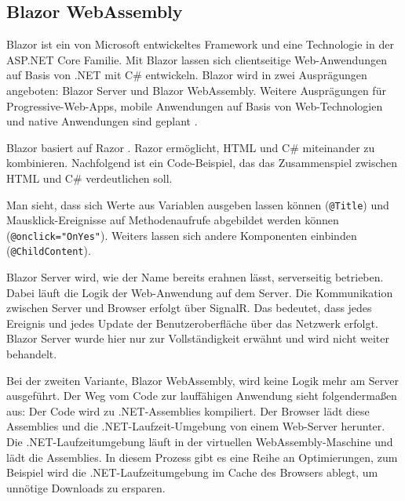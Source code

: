 

\subsection{Blazor WebAssembly}
Blazor \cite{Blazor} ist ein von Microsoft entwickeltes Framework und eine Technologie in der ASP.NET Core Familie. Mit Blazor lassen sich clientseitige Web-Anwendungen auf Basis von .NET mit C\#{} entwickeln. Blazor wird in zwei Ausprägungen angeboten: Blazor Server und Blazor WebAssembly. Weitere Ausprägungen für Progressive-Web-Apps, mobile Anwendungen auf Basis von Web-Technologien und native Anwendungen sind geplant \cite{BlazorBlog}.

Blazor basiert auf Razor \cite{Razor}. Razor ermöglicht, HTML und C\#{} miteinander zu kombinieren. Nachfolgend ist ein Code-Beispiel, das das Zusammenspiel zwischen HTML und C\#{} verdeutlichen soll.



Man sieht, dass sich Werte aus Variablen ausgeben lassen können (\lstinline{@Title}) und Maus\-klick-Ereignisse auf Methodenaufrufe abgebildet werden können (\lstinline{@onclick="OnYes"}). Weiters lassen sich andere Komponenten einbinden (\lstinline{@ChildContent}).

Blazor Server wird, wie der Name bereits erahnen lässt, serverseitig betrieben. Dabei läuft die Logik der Web-Anwendung auf dem Server. Die Kommunikation zwischen Server und Browser erfolgt über SignalR. Das bedeutet, dass jedes Ereignis und jedes Update der Benutzeroberfläche über das Netzwerk erfolgt. Blazor Server wurde hier nur zur Vollständigkeit erwähnt und wird nicht weiter behandelt.

Bei der zweiten Variante, Blazor WebAssembly, wird keine Logik mehr am Server ausgeführt. Der Weg vom Code zur lauffähigen Anwendung sieht folgendermaßen aus: Der Code wird zu .NET-Assemblies kompiliert. Der Browser lädt diese Assemblies und die .NET-Laufzeit-Umgebung von einem Web-Server herunter. Die .NET-Lauf\-zeit\-um\-ge\-bung läuft in der virtuellen WebAssembly-Maschine und lädt die Assemblies. In diesem Prozess gibt es eine Reihe an Optimierungen, zum Beispiel wird die .NET-Laufzeitumgebung im Cache des Browsers ablegt, um unnötige Downloads zu ersparen.

